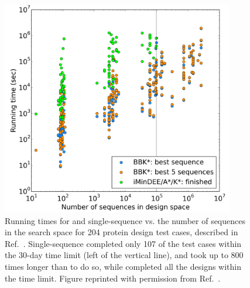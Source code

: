 \begin{figure}
\center
\includegraphics[width=4in]{figures/bbks.png}
\caption{Running times for \bbks and single-sequence \ks vs. the number of sequences in the search space for 204 protein design test cases, described in Ref.~.  Single-sequence \ks completed only 107 of the test cases within the 30-day time limit (left of the vertical line), and took up to 800 times longer than \bbks to do so, while \bbks completed all the designs within the time limit.  Figure reprinted with permission from Ref.~.  }
\label{fig:bbks}
\end{figure}
